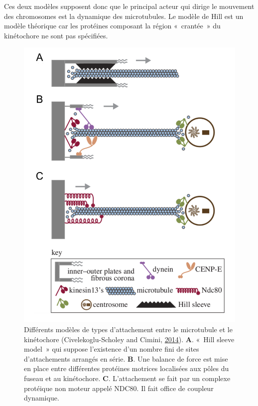 \documentclass[12pt,a4paper,twoside,openright]{book}
\begin{document}
Ces deux modèles supposent donc que le principal acteur qui dirige le
mouvement des chromosomes est la dynamique des microtubules. Le modèle
de Hill est un modèle théorique car les protéines composant la région
«~crantée~» du kinétochore ne sont pas spécifiées.

\begin{figure}[htbp]
\centering
\includegraphics{figures/intro/hill_model.png}
\caption[Différents modèles de types d'attachement entre le microtubule et le kinétochore]{\label{fig:hill_model}Différents
modèles de types d'attachement entre le microtubule et le kinétochore
(Civelekoglu-Scholey and Cimini,
\protect\hyperlink{ref-Civelekoglu-Scholey2014}{2014}). \textbf{A}.
«~Hill sleeve model~» qui suppose l'existence d'un nombre fini de sites
d'attachements arrangés en série. \textbf{B}. Une balance de force est
mise en place entre différentes protéines motrices localisées aux pôles
du fuseau et au kinétochore. \textbf{C}. L'attachement se fait par un
complexe protéique non moteur appelé NDC80. Il fait office de coupleur
dynamique.}
\end{figure}
\end{document}
